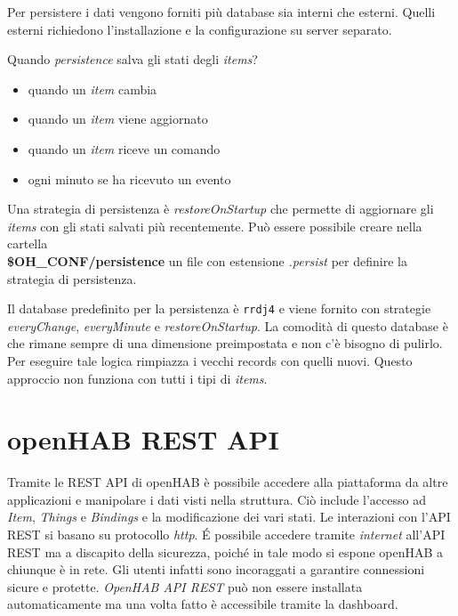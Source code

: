 Per persistere i dati vengono forniti più database sia interni che esterni. Quelli esterni richiedono l'installazione e la configurazione su server separato.

Quando {\em persistence} salva gli stati degli {\em items}?
\begin{itemize}
    \item quando un {\em item} cambia
    \item quando un {\em item} viene aggiornato
    \item quando un {\em item} riceve un comando
    \item ogni minuto se ha ricevuto un evento
\end{itemize}

Una strategia di persistenza è {\em restoreOnStartup} che permette di aggiornare gli {\em items} con gli stati salvati più recentemente. Può essere possibile creare nella cartella  \\\textbf{\$OH\_CONF/persistence} un file con estensione {\em .persist} per definire la strategia di persistenza. 

Il database predefinito per la persistenza è \texttt{rrdj4} e viene fornito con strategie {\em everyChange}, {\em everyMinute} e {\em restoreOnStartup}. La comodità di questo database è che rimane sempre di una dimensione preimpostata e non c'è bisogno di pulirlo. Per eseguire tale logica rimpiazza i vecchi records con quelli nuovi. Questo approccio non funziona con tutti i tipi di {\em items}.

\section{openHAB REST API}
Tramite le REST API di openHAB è possibile accedere alla piattaforma da altre applicazioni e manipolare i dati visti nella struttura. Ciò include l'accesso ad {\em Item}, {\em Things} e {\em Bindings} e la modificazione dei vari stati. Le interazioni con l'API REST si basano su protocollo {\em http}. \'E possibile accedere tramite {\em internet} all'API REST ma a discapito della sicurezza, poiché in tale modo si espone openHAB a chiunque è in rete. Gli utenti infatti sono incoraggati a garantire connessioni sicure e protette. {\em OpenHAB API REST} può non essere installata automaticamente ma una volta fatto è accessibile tramite la dashboard.

